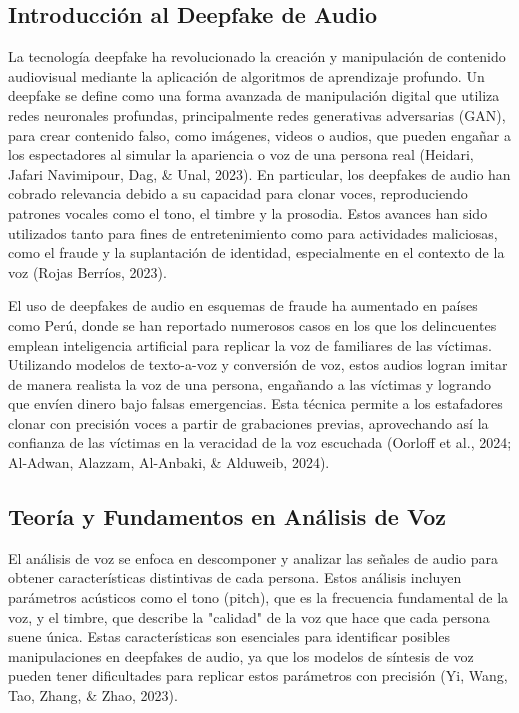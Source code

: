 \subsection{Introducción al Deepfake de Audio}
La tecnología deepfake ha revolucionado la creación y manipulación de contenido audiovisual mediante la aplicación de algoritmos de aprendizaje profundo. Un deepfake se define como una forma avanzada de manipulación digital que utiliza redes neuronales profundas, principalmente redes generativas adversarias (GAN), para crear contenido falso, como imágenes, videos o audios, que pueden engañar a los espectadores al simular la apariencia o voz de una persona real (Heidari, Jafari Navimipour, Dag, \& Unal, 2023). En particular, los deepfakes de audio han cobrado relevancia debido a su capacidad para clonar voces, reproduciendo patrones vocales como el tono, el timbre y la prosodia. Estos avances han sido utilizados tanto para fines de entretenimiento como para actividades maliciosas, como el fraude y la suplantación de identidad, especialmente en el contexto de la voz (Rojas Berríos, 2023).

El uso de deepfakes de audio en esquemas de fraude ha aumentado en países como Perú, donde se han reportado numerosos casos en los que los delincuentes emplean inteligencia artificial para replicar la voz de familiares de las víctimas. Utilizando modelos de texto-a-voz y conversión de voz, estos audios logran imitar de manera realista la voz de una persona, engañando a las víctimas y logrando que envíen dinero bajo falsas emergencias. Esta técnica permite a los estafadores clonar con precisión voces a partir de grabaciones previas, aprovechando así la confianza de las víctimas en la veracidad de la voz escuchada (Oorloff et al., 2024; Al-Adwan, Alazzam, Al-Anbaki, \& Alduweib, 2024).

\subsection{Teoría y Fundamentos en Análisis de Voz}
El análisis de voz se enfoca en descomponer y analizar las señales de audio para obtener características distintivas de cada persona. Estos análisis incluyen parámetros acústicos como el tono (pitch), que es la frecuencia fundamental de la voz, y el timbre, que describe la "calidad" de la voz que hace que cada persona suene única. Estas características son esenciales para identificar posibles manipulaciones en deepfakes de audio, ya que los modelos de síntesis de voz pueden tener dificultades para replicar estos parámetros con precisión (Yi, Wang, Tao, Zhang, \& Zhao, 2023).

